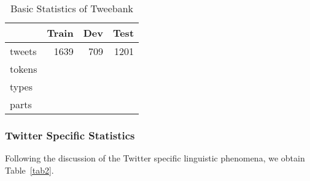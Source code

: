\documentclass[11pt,letterpaper]{article}
\begin{document}
\begin{table}[t]
\centering
 \begin{tabular}{l r r r} 
 \hline
 			& 	Train 		& 	Dev		&	Test\\[0.5ex] \hline
tweets 		&	1639 		&	709		&	1201\\
tokens 		&			&			&	\\
types 		&	 		&			&	\\
parts		 	&	 		&			&	\\ \hline
\end{tabular}
 \caption{Basic Statistics of Tweebank}
 \label{tab1}
\end{table}

\subsubsection{Twitter Specific Statistics}\label{lingphen}
Following the discussion of the Twitter specific linguistic phenomena, we obtain Table~\ref{tab2}.
\end{document}
